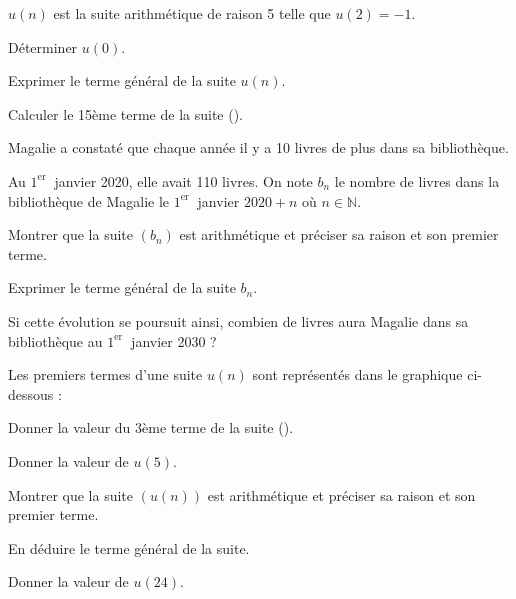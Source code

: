 \documentclass[11pt,a4paper]{article}  %
\begin{document}
$u(n)$ est la suite arithmétique de raison 5 telle que $u(2)=-1$.
\begin{enumMet}
	\item Déterminer $u(0)$.
	\item Exprimer le terme général de la suite $u(n)$.
	\item Calculer le 15ème terme de la suite (\danger).
\end{enumMet}


Magalie a constaté que chaque année il y a 10 livres de plus dans sa bibliothèque.

Au $1^{\text {er }}$ janvier 2020, elle avait 110 livres.
On note $b_n$ le nombre de livres dans la bibliothèque de Magalie le $1^{\text {er }}$ janvier $2020+n$ où $n \in \mathbb{N}$.
\begin{enumMet}
	\item Montrer que la suite $\left(b_n\right)$ est arithmétique et préciser sa raison et son premier terme.
	\item Exprimer le terme général de la suite $b_n$.
	\item Si cette évolution se poursuit ainsi, combien de livres aura Magalie dans sa bibliothèque au $1^{\text {er }}$ janvier 2030 ?
\end{enumMet}


Les premiers termes d'une suite $u(n)$ sont représentés dans le graphique ci-dessous :

\begin{center}
\end{center}

\begin{enumMet}
	\item Donner la valeur du 3ème terme de la suite (\danger).
	\item Donner la valeur de $u(5)$.
	\item Montrer que la suite $\left(u(n)\right)$ est arithmétique et préciser sa raison et son premier terme.
	\item En déduire le terme général de la suite.
	\item {} Donner la valeur de $u(24)$.
\end{enumMet}
\end{document}
